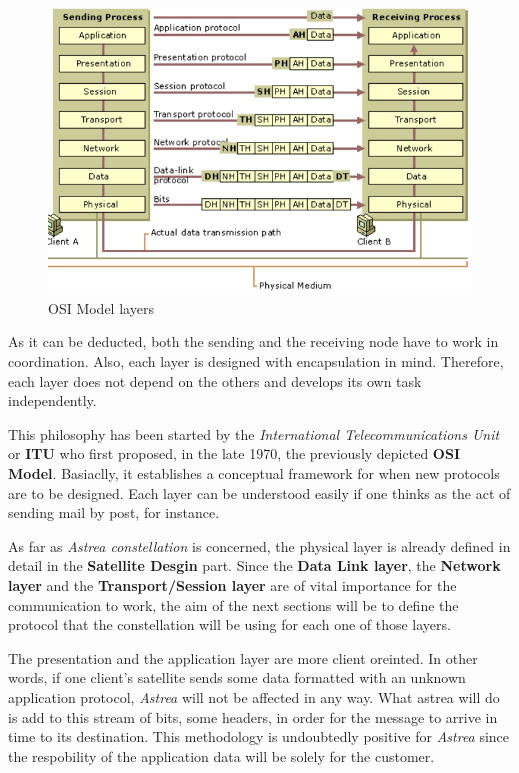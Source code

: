 \begin{figure}[H]
\centering
\includegraphics[scale=0.8]{./sections/CommunicationsDept/OSI}
\caption{OSI Model layers}
\label{fig:osi}
\end{figure}

As it can be deducted, both the sending and the receiving node have to work in coordination. Also, each layer is designed with encapsulation in mind. Therefore, each layer does not depend on the others and develops its own task independently.

This philosophy has been started by the \textit{International Telecommunications Unit} or \textbf{ITU} who first proposed, in the late 1970, the previously depicted \textbf{OSI Model}. Basiaclly, it establishes a conceptual framework for when new protocols are to be designed. Each layer can be understood easily if one thinks as the act of sending mail by post, for instance.

As far as \textit{Astrea constellation} is concerned, the physical layer is already defined in detail in the \textbf{Satellite Desgin} part. Since the\textbf{ Data Link layer}, the \textbf{Network layer} and the \textbf{Transport/Session layer} are of vital importance for the communication to work, the aim of the next sections will be to define the protocol that the constellation will be using for each one of those layers.

The presentation and the application layer are more client oreinted. In other words, if one client's satellite sends some data formatted with an unknown application protocol, \textit{Astrea} will not be affected in any way. What astrea will do is add to this stream of bits, some headers, in order for the message to arrive in time to its destination. This methodology is undoubtedly positive for \textit{Astrea} since the respobility of the application data will be solely for the customer.